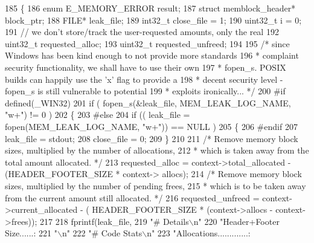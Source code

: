 \begin{DoxyCode}
185 \{
186         \textcolor{keyword}{enum} E_MEMORY_ERROR     result;
187         \textcolor{keyword}{struct }memblock_header* block\_ptr;
188         FILE*           leak\_file;
189         int32\_t         close\_file = 1;
190         uint32\_t        i = 0;
191         \textcolor{comment}{// we don't store/track the user-requested amounts, only the real}
192         uint32\_t        requested\_alloc;
193         uint32\_t        requested\_unfreed;
194 
195         \textcolor{comment}{/* since Windows has been kind enough to not provide more standards
}
196 \textcolor{comment}{         * complaint security functionality, we shall have to use their own
}
197 \textcolor{comment}{         * fopen\_s. POSIX builds can happily use the 'x' flag to provide a
}
198 \textcolor{comment}{         * decent security level - fopen\_s is still vulnerable to potential
}
199 \textcolor{comment}{         * exploits ironically... */}
200 \textcolor{preprocessor}{#if defined(\_WIN32)
}
201 \textcolor{preprocessor}{}        \textcolor{keywordflow}{if} ( fopen\_s(&leak\_file, MEM_LEAK_LOG_NAME, \textcolor{stringliteral}{"w+"}) != 0 )
202         \{
203 \textcolor{preprocessor}{#else
}
204 \textcolor{preprocessor}{}        \textcolor{keywordflow}{if} (( leak\_file = fopen(MEM_LEAK_LOG_NAME, \textcolor{stringliteral}{"w+"})) == NULL )
205         \{
206 \textcolor{preprocessor}{#endif
}
207 \textcolor{preprocessor}{}                leak\_file = stdout;
208                 close\_file = 0;
209         \}
210 
211         \textcolor{comment}{/* Remove memory block sizes, multiplied by the number of allocations,
}
212 \textcolor{comment}{         * which is taken away from the total amount allocated. */}
213         requested\_alloc         = context->total_allocated - (HEADER_FOOTER_SIZE * context->
      allocs);
214         \textcolor{comment}{/* Remove memory block sizes, multiplied by the number of pending frees,
}
215 \textcolor{comment}{         * which is to be taken away from the current amount still allocated. */}
216         requested\_unfreed       = context->current_allocated - (
      HEADER_FOOTER_SIZE * (context->allocs - context->frees));
217 
218         fprintf(leak\_file,
219                 \textcolor{stringliteral}{"# Details\(\backslash\)n"}
220                 \textcolor{stringliteral}{"Header+Footer Size......: %
221                 \textcolor{stringliteral}{"\(\backslash\)n"}
222                 \textcolor{stringliteral}{"# Code Stats\(\backslash\)n"}
223                 \textcolor{stringliteral}{"Allocations.............: %
}}
\end{DoxyCode}
